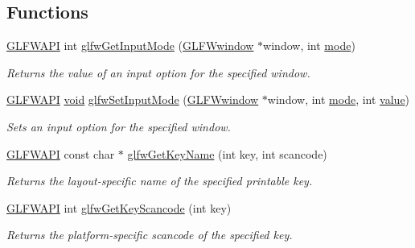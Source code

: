 \subsection*{Functions}
\begin{DoxyCompactItemize}
\item 
\mbox{\hyperlink{glfw3_8h_a56da5036b2cc259351ae22fd6439bb47}{G\+L\+F\+W\+A\+PI}} int \mbox{\hyperlink{group__input_ga1248dd5b1e566b2817e71547564d6af9}{glfw\+Get\+Input\+Mode}} (\mbox{\hyperlink{group__window_ga3c96d80d363e67d13a41b5d1821f3242}{G\+L\+F\+Wwindow}} $\ast$window, int \mbox{\hyperlink{glad_8h_a1e71d9c196e4683cc06c4b54d53f7ef5}{mode}})
\begin{DoxyCompactList}\small\item\em Returns the value of an input option for the specified window. \end{DoxyCompactList}\item 
\mbox{\hyperlink{glfw3_8h_a56da5036b2cc259351ae22fd6439bb47}{G\+L\+F\+W\+A\+PI}} \mbox{\hyperlink{glad_8h_a950fc91edb4504f62f1c577bf4727c29}{void}} \mbox{\hyperlink{group__input_gae1eb729d2dd91dc33fd60e150a6e1684}{glfw\+Set\+Input\+Mode}} (\mbox{\hyperlink{group__window_ga3c96d80d363e67d13a41b5d1821f3242}{G\+L\+F\+Wwindow}} $\ast$window, int \mbox{\hyperlink{glad_8h_a1e71d9c196e4683cc06c4b54d53f7ef5}{mode}}, int \mbox{\hyperlink{glad_8h_a03aff08f73d7fde3d1a08e0abd8e84fa}{value}})
\begin{DoxyCompactList}\small\item\em Sets an input option for the specified window. \end{DoxyCompactList}\item 
\mbox{\hyperlink{glfw3_8h_a56da5036b2cc259351ae22fd6439bb47}{G\+L\+F\+W\+A\+PI}} const char $\ast$ \mbox{\hyperlink{group__input_ga9323a397832dd03faa2a88534847c984}{glfw\+Get\+Key\+Name}} (int key, int scancode)
\begin{DoxyCompactList}\small\item\em Returns the layout-\/specific name of the specified printable key. \end{DoxyCompactList}\item 
\mbox{\hyperlink{glfw3_8h_a56da5036b2cc259351ae22fd6439bb47}{G\+L\+F\+W\+A\+PI}} int \mbox{\hyperlink{group__input_ga3ea3b9d74f8352506068620980e01fe5}{glfw\+Get\+Key\+Scancode}} (int key)
\begin{DoxyCompactList}\small\item\em Returns the platform-\/specific scancode of the specified key. \end{DoxyCompactList}\item 

\end{DoxyCompactItemize}
